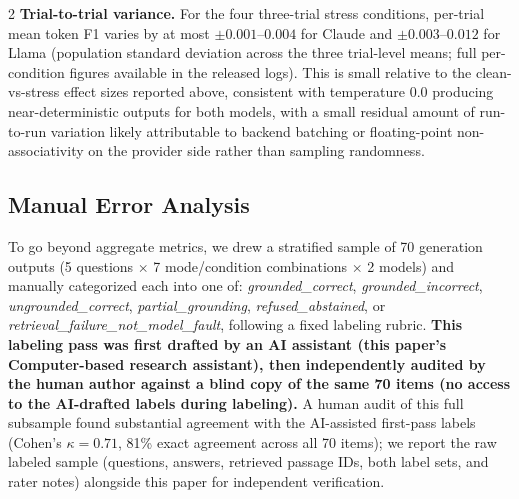 \documentclass[11pt,a4paper]{article}
\begin{document}
\begin{multicols}{2}
\textbf{Trial-to-trial variance.} For the four three-trial stress conditions, per-trial mean token F1 varies by at most $\pm 0.001$--$0.004$ for Claude and $\pm 0.003$--$0.012$ for Llama (population standard deviation across the three trial-level means; full per-condition figures available in the released logs). This is small relative to the clean-vs-stress effect sizes reported above, consistent with temperature 0.0 producing near-deterministic outputs for both models, with a small residual amount of run-to-run variation likely attributable to backend batching or floating-point non-associativity on the provider side rather than sampling randomness.

\subsection{Manual Error Analysis}
\label{sec:empirical-erroranalysis}

To go beyond aggregate metrics, we drew a stratified sample of 70 generation outputs (5 questions $\times$ 7 mode/condition combinations $\times$ 2 models) and manually categorized each into one of: \textit{grounded\_correct}, \textit{grounded\_incorrect}, \textit{ungrounded\_correct}, \textit{partial\_grounding}, \textit{refused\_abstained}, or \textit{retrieval\_failure\_not\_model\_fault}, following a fixed labeling rubric. \textbf{This labeling pass was first drafted by an AI assistant (this paper's Computer-based research assistant), then independently audited by the human author against a blind copy of the same 70 items (no access to the AI-drafted labels during labeling).} A human audit of this full subsample found substantial agreement with the AI-assisted first-pass labels (Cohen's $\kappa = 0.71$, 81\% exact agreement across all 70 items); we report the raw labeled sample (questions, answers, retrieved passage IDs, both label sets, and rater notes) alongside this paper for independent verification.


\end{multicols}
\end{document}

